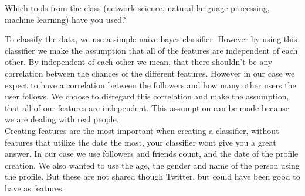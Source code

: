 Which tools from the class (network science, natural language processing, machine learning) have you used? 

To classify the data, we use a simple naive bayes classifier. However by using this classifier we make the assumption that all of the features are independent of each other. By independent of each other we mean, that there shouldn't be any correlation between the chances of the different features. However in our case we expect to have a correlation between the followers and how many other users the user follows. We choose to disregard this correlation and make the assumption, that all of our features are independent. This assumption can be made because we are dealing with real people.\\
Creating features are the most important when creating a classifier, without features that utilize the date the most, your classifier wont give you a great answer. In our case we use followers and friends count, and the date of the profile creation. We also wanted to use the age, the gender and name of the person using the profile. But these are not shared though Twitter, but could have been good to have as features.\\
\\